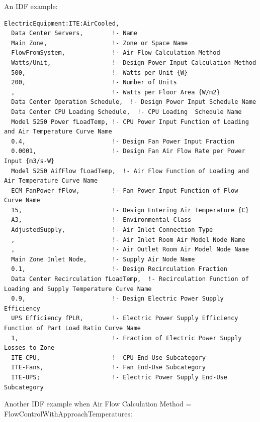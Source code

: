 An IDF example:

\begin{lstlisting}
ElectricEquipment:ITE:AirCooled,
  Data Center Servers,        !- Name
  Main Zone,                  !- Zone or Space Name
  FlowFromSystem,             !- Air Flow Calculation Method
  Watts/Unit,                 !- Design Power Input Calculation Method
  500,                        !- Watts per Unit {W}
  200,                        !- Number of Units
  ,                           !- Watts per Floor Area {W/m2}
  Data Center Operation Schedule,  !- Design Power Input Schedule Name
  Data Center CPU Loading Schedule,  !- CPU Loading  Schedule Name
  Model 5250 Power fLoadTemp, !- CPU Power Input Function of Loading and Air Temperature Curve Name
  0.4,                        !- Design Fan Power Input Fraction
  0.0001,                     !- Design Fan Air Flow Rate per Power Input {m3/s-W}
  Model 5250 AifFlow fLoadTemp,  !- Air Flow Function of Loading and Air Temperature Curve Name
  ECM FanPower fFlow,         !- Fan Power Input Function of Flow Curve Name
  15,                         !- Design Entering Air Temperature {C}
  A3,                         !- Environmental Class
  AdjustedSupply,             !- Air Inlet Connection Type
  ,                           !- Air Inlet Room Air Model Node Name
  ,                           !- Air Outlet Room Air Model Node Name
  Main Zone Inlet Node,       !- Supply Air Node Name
  0.1,                        !- Design Recirculation Fraction
  Data Center Recirculation fLoadTemp,  !- Recirculation Function of Loading and Supply Temperature Curve Name
  0.9,                        !- Design Electric Power Supply Efficiency
  UPS Efficiency fPLR,        !- Electric Power Supply Efficiency Function of Part Load Ratio Curve Name
  1,                          !- Fraction of Electric Power Supply Losses to Zone
  ITE-CPU,                    !- CPU End-Use Subcategory
  ITE-Fans,                   !- Fan End-Use Subcategory
  ITE-UPS;                    !- Electric Power Supply End-Use Subcategory
\end{lstlisting}

Another IDF example when Air Flow Calculation Method = FlowControlWithApproachTemperatures:

